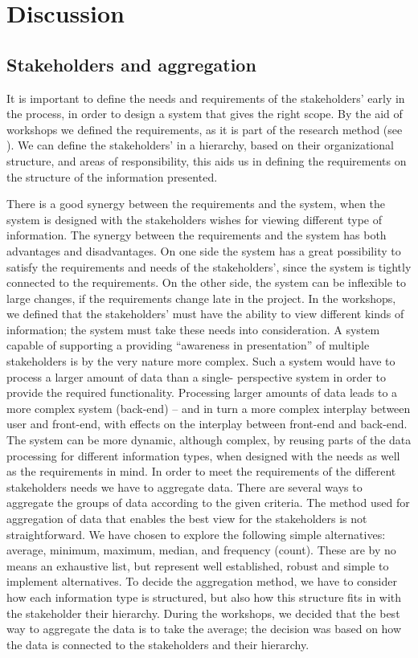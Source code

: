 \chapter{Discussion}
\label{chapter:discussion}

\section{Stakeholders and aggregation} %
\label{sec:discussion_stakeholders'_and_aggregation}
It is important to define the needs and requirements of the stakeholders' 
early in the process, in order to design a system that gives the right scope. 
By the aid of workshops we defined the requirements, as it is part of the 
research method (see ). We can define the stakeholders' in 
a hierarchy, based on their organizational structure, and areas of 
responsibility, this aids us in defining the requirements on the structure of 
the information presented.

There is a good synergy between the requirements and the system, when the 
system is designed with the stakeholders wishes for viewing different type of 
information. The synergy between the requirements and the system has both 
advantages and disadvantages. On one side the system has a great possibility 
to satisfy the requirements and needs of the stakeholders', since the system 
is tightly connected to the requirements. On the other side, the system can be 
inflexible to large changes, if the requirements change late in the project. 
In the workshops, we defined that the stakeholders' must have the ability to 
view different kinds of information; the system must take these needs into 
consideration. A system capable of supporting a providing “awareness in 
presentation” of multiple stakeholders is by the very nature more complex. 
Such a system would have to process a larger amount of data than a single-
perspective system in order to provide the required functionality. Processing 
larger amounts of data leads to a more complex system (back-end) – and in turn 
a more complex interplay between user and front-end, with effects on the 
interplay between front-end and back-end. The system can be more dynamic, 
although complex, by reusing parts of the data processing for different 
information types, when designed with the needs as well as the requirements in 
mind. In order to meet the requirements of the different stakeholders needs we 
have to aggregate data. There are several ways to aggregate the groups of data 
according to the given criteria. The method used for aggregation of data that 
enables the best view for the stakeholders is not straightforward. We have 
chosen to explore the following simple alternatives: average, minimum, 
maximum, median, and frequency (count). These are by no means an exhaustive 
list, but represent well established, robust and simple to implement 
alternatives. To decide the aggregation method, we have to consider how each 
information type is structured, but also how this structure fits in with the 
stakeholder their hierarchy. During the workshops, we decided that the best 
way to aggregate the data is to take the average; the decision was based on 
how the data is connected to the stakeholders and their hierarchy.

